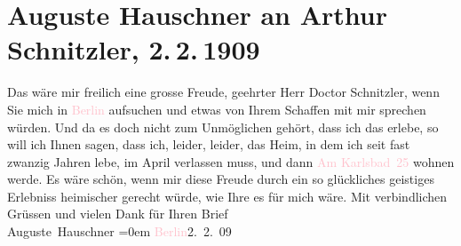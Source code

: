 

               \section[Auguste Hauschner an Arthur Schnitzler, 2. 2. 1909]{ Auguste Hauschner an Arthur Schnitzler, 2. 2. 1909}\nopagebreak{}\rehead{ }\normalsize\beginnumbering{} \toendnotes[C]{\smallbreak\pagebreak[2]} 
\toendnotes[C]{\smallbreak}\pstart
           \noindent{}{\pb}Das wäre mir freilich eine grosse Freude, geehrter Herr
               Doctor Schnitzler, wenn Sie mich in \textcolor{pink}{Berlin}{}\ledrightnote{\textcolor{pink}{Berlin}} aufsuchen
               und etwas von Ihrem Schaffen mit mir sprechen würden. Und da es doch nicht zum
               Unmöglichen gehört, dass ich das erlebe, so will ich Ihnen sagen, dass ich, leider,
               leider, das Heim, in dem ich seit fast zwanzig Jahren lebe, im April
               verlassen muss, und dann \textcolor{pink}{Am {\pb}Karlsbad 25}{}\ledrightnote{\textcolor{pink}{Am Karlsbad}} wohnen werde.\pend
           \pstart
           Es wäre schön, wenn mir diese Freude durch ein so glückliches geistiges Erlebniss
               heimischer gerecht würde, wie Ihre \label{K_L02588-1v}\label{K_L02588-1h} es für mich wäre.\pend
           \pstart
           Mit verbindlichen Grüssen und vielen Dank für Ihren Brief{\\[\baselineskip]}\spacefill\mbox{Auguste Hauschner}\pend
           \leftskip=0em{}\pstart
           \textcolor{pink}{Berlin}{}\ledrightnote{\textcolor{pink}{Berlin}}{ }2. 2. 09\pend
           \endnumbering{}  
      